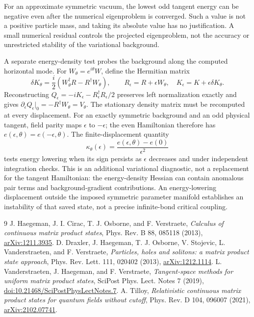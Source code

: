 \documentclass[11pt]{article}
\begin{document}
For an approximate symmetric vacuum, the lowest odd tangent energy can be
negative even after the numerical eigenproblem is converged. Such a value
is not a positive particle mass, and taking its absolute value has no
justification. A small numerical residual controls the projected eigenproblem,
not the accuracy or unrestricted stability of the variational background.

A separate energy-density test probes the background along the computed
horizontal mode. For $W_\theta=e^{i\theta}W$, define the Hermitian matrix
\begin{equation}
 \delta K_\theta=\frac{i}{2}(W_\theta^\dagger R-R^\dagger W_\theta),\qquad
 R_\epsilon=R+\epsilon W_\theta,\quad
 K_\epsilon=K+\epsilon\delta K_\theta.
\end{equation}
Reconstructing $Q_\epsilon=-iK_\epsilon-R_\epsilon^\dagger R_\epsilon/2$
preserves left normalization exactly and gives
$\partial_\epsilon Q_\epsilon|_0=-R^\dagger W_\theta=V_\theta$.
The stationary density matrix must be recomputed at every displacement.
For an exactly symmetric background and an odd physical tangent, field
parity maps $\epsilon$ to $-\epsilon$; the even Hamiltonian therefore has
$e(\epsilon,\theta)=e(-\epsilon,\theta)$. The finite-displacement quantity
\begin{equation}
 \kappa_\theta(\epsilon)=
 \frac{e(\epsilon,\theta)-e(0)}{\epsilon^2}
\end{equation}
tests energy lowering when its sign persists as $\epsilon$ decreases and
under independent integration checks. This is an additional variational
diagnostic, not a replacement for the tangent Hamiltonian: the energy-density
Hessian can contain anomalous pair terms and background-gradient contributions.
An energy-lowering displacement outside the imposed symmetric parameter
manifold establishes an instability of that saved state, not a precise
infinite-bond critical coupling.

\begin{thebibliography}{9}
 J. Haegeman, J. I. Cirac, T. J. Osborne, and F. Verstraete,
\emph{Calculus of continuous matrix product states}, Phys. Rev. B 88, 085118
(2013), \href{https://arxiv.org/abs/1211.3935}{arXiv:1211.3935}.
 D. Draxler, J. Haegeman, T. J. Osborne, V. Stojevic,
L. Vanderstraeten, and F. Verstraete,
\emph{Particles, holes and solitons: a matrix product state approach},
Phys. Rev. Lett. 111, 020402 (2013),
\href{https://arxiv.org/abs/1212.1114}{arXiv:1212.1114}.
 L. Vanderstraeten, J. Haegeman, and F. Verstraete,
\emph{Tangent-space methods for uniform matrix product states},
SciPost Phys. Lect. Notes 7 (2019),
\href{https://scipost.org/10.21468/SciPostPhysLectNotes.7}{doi:10.21468/SciPostPhysLectNotes.7}.
 A. Tilloy,
\emph{Relativistic continuous matrix product states for quantum fields without cutoff},
Phys. Rev. D 104, 096007 (2021),
\href{https://arxiv.org/abs/2102.07741}{arXiv:2102.07741}.
\end{thebibliography}
\end{document}

